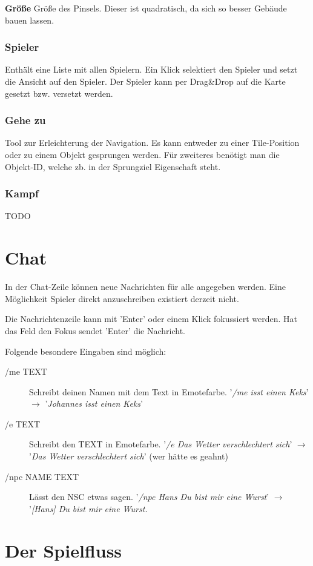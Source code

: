 \documentclass[german,10pt,a4paper,twocolumn,colorscheme=darkblue]{orarticle}
\begin{document}
			\textbf{Größe} Größe des Pinsels. Dieser ist quadratisch, da sich so besser Gebäude bauen lassen.
		
		\subsubsection*{Spieler}
			Enthält eine Liste mit allen Spielern. Ein Klick selektiert den Spieler und setzt die Ansicht auf den Spieler. Der Spieler kann per Drag\&Drop auf die Karte gesetzt bzw. versetzt werden.
		\subsubsection*{Gehe zu}
			Tool zur Erleichterung der Navigation. Es kann entweder zu einer Tile-Position oder zu einem Objekt gesprungen werden. Für zweiteres benötigt man die Objekt-ID, welche zb. in der Sprungziel Eigenschaft steht.
		\subsubsection*{Kampf}
			TODO
		
	\section{Chat}
		In der Chat-Zeile können neue Nachrichten für alle angegeben werden. Eine Möglichkeit Spieler direkt anzuschreiben existiert derzeit nicht.
		
		Die Nachrichtenzeile kann mit 'Enter' oder einem Klick fokussiert werden. Hat das Feld den Fokus sendet 'Enter' die Nachricht.
		
		Folgende besondere Eingaben sind möglich:
		\begin{description}
		\item[/me TEXT] Schreibt deinen Namen mit dem Text in Emotefarbe. '\textit{/me isst einen Keks}' $\rightarrow$ '\textit{Johannes isst einen Keks}'
		\item[/e TEXT] Schreibt den TEXT in Emotefarbe. '\textit{/e Das Wetter verschlechtert sich}' $\rightarrow$ '\textit{Das Wetter verschlechtert sich}' (wer hätte es geahnt)
		 \item[/npc NAME TEXT] Lässt den NSC etwas sagen. '\textit{/npc Hans Du bist mir eine Wurst}' $\rightarrow$ '\textit{[Hans] Du bist mir eine Wurst.}
		\end{description}
	
	\section{Der Spielfluss}
	
\end{document}
